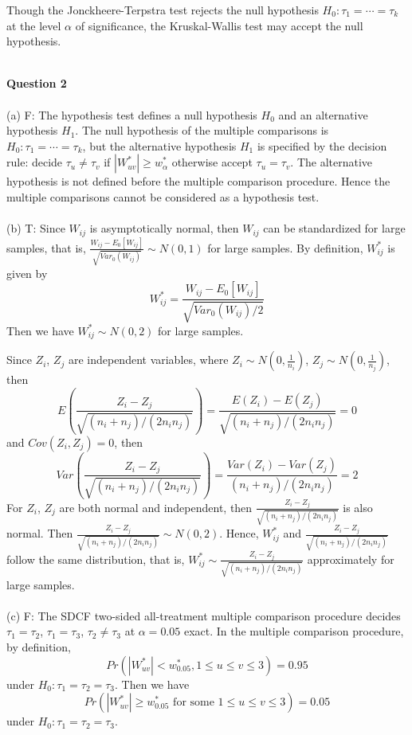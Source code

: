 \documentclass[12pt,a4paper]{article}
\begin{document}
Though the Jonckheere-Terpstra test rejects the null hypothesis $H_{0}:\tau_{1}=\cdots=\tau_{k}$ at the level $\alpha$ of significance, the Kruskal-Wallis test may accept the null hypothesis.

~\\
\indent \textbf{Question 2}\\
~\\
(a) F: The hypothesis test defines a null hypothesis $H_{0}$ and an alternative hypothesis $H_{1}$. The null hypothesis of the multiple comparisons is $H_{0}:\tau_{1}=\cdots=\tau_{k}$, but the alternative hypothesis $H_{1}$ is specified by the decision rule: decide $\tau_{u}\neq \tau_{v}$ if $|W_{uv}^{\ast}|\geqslant w_{\alpha}^{\ast}$ otherwise accept $\tau_{u}=\tau_{v}$. The alternative hypothesis is not defined before the multiple comparison procedure. Hence the multiple comparisons cannot be considered as a hypothesis test.\\
~\\
(b) T: Since $W_{ij}$ is asymptotically normal, then $W_{ij}$ can be standardized for large samples, that is, $\frac{W_{ij}-E_{0}[W_{ij}]}{\sqrt{Var_{0}(W_{ij})}}\sim N(0,1)$ for large samples. By definition, $W_{ij}^{\ast}$ is given by $$W_{ij}^{\ast}=\frac{W_{ij}-E_{0}[W_{ij}]}{\sqrt{Var_{0}(W_{ij})/2}}$$Then we have $W_{ij}^{\ast}\sim N(0,2)$ for large samples. 

Since $Z_{i}$, $Z_{j}$ are independent variables, where $Z_{i}\sim N(0,\frac{1}{n_{i}})$, $Z_{j}\sim N(0,\frac{1}{n_{j}})$, then $$E\left(\frac{Z_{i}-Z_{j}}{\sqrt{(n_{i}+n_{j})/(2n_{i}n_{j})}}\right)=\frac{E(Z_{i})-E(Z_{j})}{\sqrt{(n_{i}+n_{j})/(2n_{i}n_{j})}}=0$$ and $Cov(Z_{i},Z_{j})=0$, then $$Var\left(\frac{Z_{i}-Z_{j}}{\sqrt{(n_{i}+n_{j})/(2n_{i}n_{j})}}\right)=\frac{Var(Z_{i})-Var(Z_{j})}{(n_{i}+n_{j})/(2n_{i}n_{j})}=2$$ For $Z_{i}$, $Z_{j}$ are both normal and independent, then $\frac{Z_{i}-Z_{j}}{\sqrt{(n_{i}+n_{j})/(2n_{i}n_{j})}}$ is also normal. Then $\frac{Z_{i}-Z_{j}}{\sqrt{(n_{i}+n_{j})/(2n_{i}n_{j})}}\sim N(0,2)$. Hence, $W_{ij}^{\ast}$ and $\frac{Z_{i}-Z_{j}}{\sqrt{(n_{i}+n_{j})/(2n_{i}n_{j})}}$ follow the same distribution, that is, $W_{ij}^{\ast} \sim \frac{Z_{i}-Z_{j}}{\sqrt{(n_{i}+n_{j})/(2n_{i}n_{j})}}$ approximately for large samples.\\
~\\
(c) F: The SDCF two-sided all-treatment multiple comparison procedure decides $\tau_{1}=\tau_{2}$, $\tau_{1}=\tau_{3}$, $\tau_{2}\neq\tau_{3}$ at $\alpha=0.05$ exact. In the multiple comparison procedure, by definition,  $$Pr(|W_{uv}^{*}|<w_{0.05}^{*},1\leqslant u\leqslant v\leqslant 3)=0.95$$ under $H_{0}:\tau_{1}=\tau_{2}=\tau_{3}$. Then we have $$Pr\left(|W_{uv}^{*}|\geqslant w_{0.05}^{*}\text{ for some }1\leqslant u\leqslant v\leqslant 3\right)=0.05$$
under $H_{0}:\tau_{1}=\tau_{2}=\tau_{3}$. 
\end{document}
